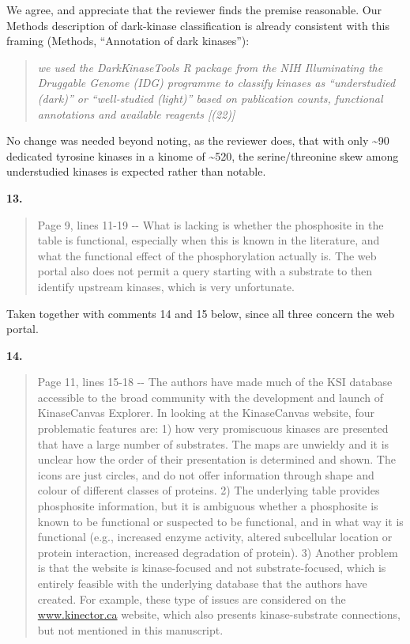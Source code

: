 \documentclass[
]{article}
\begin{document}
We agree, and appreciate that the reviewer finds the premise reasonable.
Our Methods description of dark-kinase classification is already
consistent with this framing (Methods, ``Annotation of dark kinases''):

\begin{quote}
\emph{we used the DarkKinaseTools R package from the NIH Illuminating
the Druggable Genome (IDG) programme to classify kinases as
``understudied (dark)'' or ``well-studied (light)'' based on publication
counts, functional annotations and available reagents {[}(22){]}}
\end{quote}

No change was needed beyond noting, as the reviewer does, that with only
\textasciitilde90 dedicated tyrosine kinases in a kinome of
\textasciitilde520, the serine/threonine skew among understudied kinases
is expected rather than notable.

\textbf{13.}

\begin{quote}
Page 9, lines 11-19 -\/- What is lacking is whether the phosphosite in
the table is functional, especially when this is known in the
literature, and what the functional effect of the phosphorylation
actually is. The web portal also does not permit a query starting with a
substrate to then identify upstream kinases, which is very unfortunate.
\end{quote}

Taken together with comments 14 and 15 below, since all three concern
the web portal.

\textbf{14.}

\begin{quote}
Page 11, lines 15-18 -\/- The authors have made much of the KSI database
accessible to the broad community with the development and launch of
KinaseCanvas Explorer. In looking at the KinaseCanvas website, four
problematic features are: 1) how very promiscuous kinases are presented
that have a large number of substrates. The maps are unwieldy and it is
unclear how the order of their presentation is determined and shown. The
icons are just circles, and do not offer information through shape and
colour of different classes of proteins. 2) The underlying table
provides phosphosite information, but it is ambiguous whether a
phosphosite is known to be functional or suspected to be functional, and
in what way it is functional (e.g., increased enzyme activity, altered
subcellular location or protein interaction, increased degradation of
protein). 3) Another problem is that the website is kinase-focused and
not substrate-focused, which is entirely feasible with the underlying
database that the authors have created. For example, these type of
issues are considered on the
\href{http://www.kinector.ca}{www.kinector.ca} website, which also
presents kinase-substrate connections, but not mentioned in this
manuscript.
\end{quote}
\end{document}
